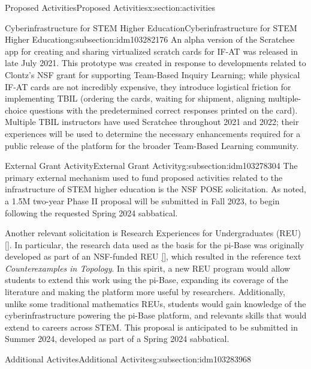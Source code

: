 \documentclass[oneside,10pt,]{article}
\newcommand{\xreffont}{\relax}
\newcommand{\pubtitle}[1]{\textsl{#1}}
\begin{document}
\begin{sectionptx}{Proposed Activities}{}{Proposed Activities}{}{}{x:section:activities}
\begin{subsectionptx}{Cyberinfrastructure for STEM Higher Education}{}{Cyberinfrastructure for STEM Higher Education}{}{}{g:subsection:idm103282176}
An alpha version of the Scratchee app for creating and sharing virtualized scratch cards for IF-AT was released in late July 2021. This prototype was created in response to developments related to Clontz's NSF grant for supporting Team-Based Inquiry Learning; while physical IF-AT cards are not incredibly expensive, they introduce logistical friction for implementing TBIL (ordering the cards, waiting for shipment, aligning multiple-choice questions with the predetermined correct responses printed on the card). Multiple TBIL instructors have used Scratchee throughout 2021 and 2022; their experiences will be used to determine the necessary enhancements required for a public release of the platform for the broader Team-Based Learning community.%
\end{subsectionptx}
%
%
\typeout{************************************************}
\typeout{************************************************}
%
\begin{subsectionptx}{External Grant Activity}{}{External Grant Activity}{}{}{g:subsection:idm103278304}
The primary external mechanism used to fund proposed activities related to the infrastructure of STEM higher education is the NSF POSE solicitation. As noted, a \textdollar{}1.5M two-year Phase II proposal will be submitted in Fall 2023, to begin following the requested Spring 2024 sabbatical.%
\par
Another relevant solicitation is Research Experiences for Undergraduates (REU) \hyperlink{x:biblio:biblio-reu}{[{\xreffont 23}]}. In particular, the research data used as the basis for the pi-Base was originally developed as part of an NSF-funded REU \hyperlink{x:biblio:biblio-steen}{[{\xreffont 15}]}, which resulted in the reference text \pubtitle{Counterexamples in Topology}. In this spirit, a new REU program would allow students to extend this work using the pi-Base, expanding its coverage of the literature and making the platform more useful by researchers. Additionally, unlike some traditional mathematics REUs, students would gain knowledge of the cyberinfrastructure powering the pi-Base platform, and relevants skills that would extend to careers across STEM. This proposal is anticipated to be submitted in Summer 2024, developed as part of a Spring 2024 sabbatical.%
\end{subsectionptx}
%
%
\typeout{************************************************}
\typeout{************************************************}
%
\begin{subsectionptx}{Additional Activites}{}{Additional Activites}{}{}{g:subsection:idm103283968}

\end{subsectionptx}
\end{sectionptx}
\end{document}
